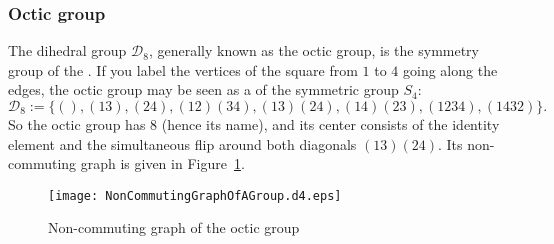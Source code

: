 \documentclass[12pt]{article}
\newcommand{\<}{\langle}
\renewcommand{\>}{\rangle}
\newcommand{\mc}{\mathcal}
\begin{document}
\subsubsection*{Octic group}
The dihedral group $\mc{D}_8$, generally known as the octic group, is
the symmetry group of the . If you label the vertices of the
square from $1$ to $4$ going along the edges, the octic group may be
seen as a  of the symmetric group $S_4$:
\begin{equation*}
\mc{D}_8:=\{(),(13),(24),(12)(34),(13)(24),(14)(23),(1234),(1432)\}.
\end{equation*}
So the octic group has  $8$ (hence its name), and its center
consists of the identity element and the simultaneous flip around both
diagonals $(13)(24)$. Its non-commuting graph is given in
Figure~\ref{fig:d4}.

\begin{figure}
\label{fig:d4}
\begin{center}
\texttt{[image: NonCommutingGraphOfAGroup.d4.eps]}
\end{center}
\sf\caption{Non-commuting graph of the octic group}
\end{figure}
\end{document}
